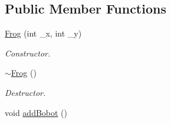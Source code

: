 \subsection*{Public Member Functions}
\begin{DoxyCompactItemize}
\item 
\hyperlink{classFrog_a03e51490a1a0256508fb10031a8c9c4a}{Frog} (int \-\_\-x, int \-\_\-y)
\begin{DoxyCompactList}\small\item\em Constructor. \end{DoxyCompactList}\item 
\hypertarget{classFrog_a03c9cd2a028e2466a3bfe5e9af1c12e7}{\hyperlink{classFrog_a03c9cd2a028e2466a3bfe5e9af1c12e7}{$\sim$\-Frog} ()}\label{classFrog_a03c9cd2a028e2466a3bfe5e9af1c12e7}

\begin{DoxyCompactList}\small\item\em Destructor. \end{DoxyCompactList}\item 
\hypertarget{classFrog_adc65110eaafac9cf99e47b52f04a4050}{void \hyperlink{classFrog_adc65110eaafac9cf99e47b52f04a4050}{add\-Bobot} ()}\label{classFrog_adc65110eaafac9cf99e47b52f04a4050}


\end{DoxyCompactItemize}
